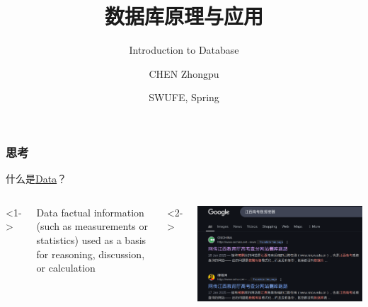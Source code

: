 \documentclass[aspectratio=169, 14pt]{beamer}
\title[Database Principles and Applications] %
{数据库原理与应用}
\subtitle{Introduction to Database}
\author[CHEN Zhongpu] %
{CHEN Zhongpu}
\institute[] %
{
  School of Computing and Artificial Intelligence \\
  \href{mailto:zpchen@swufe.edu.cn}{zpchen@swufe.edu.cn}
}
\date[] %
{SWUFE, Spring \the\year{}}
\begin{document}
\frame{\titlepage}

\begin{frame}
	\frametitle{思考}
	{\large {}} 什么是\href{https://www.merriam-webster.com/dictionary/data}{Data}？

	\begin{columns}
		<1->
		\begin{block}{Data}
			factual information (such as measurements or statistics) used as a basis for reasoning, discussion, or calculation
		\end{block}

		<2->
		\begin{center}
			\includegraphics[width=\textwidth]{week1/jiangxi}
		\end{center}
	\end{columns}

\end{frame}
\end{document}
